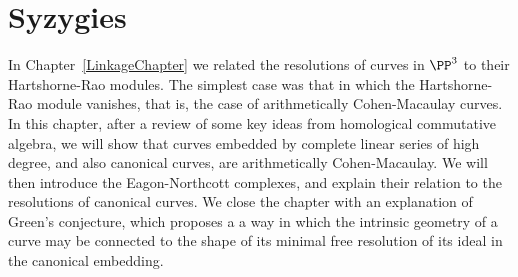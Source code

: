 

\chapter{Syzygies}
\label{SyzygiesChapter}

%
%
%
%
%
\def\length{{\rm length}}

%
%


In Chapter~\ref{LinkageChapter} we related the resolutions of curves in $\PP^3$ to their Hartshorne-Rao modules. The
simplest case was that in which the Hartshorne-Rao module vanishes, that is, the case of arithmetically Cohen-Macaulay curves.
In this chapter, after a review of some key ideas from homological commutative algebra, we will show that curves embedded by complete linear series of high degree, and also canonical curves, are arithmetically
Cohen-Macaulay. We will then introduce the Eagon-Northcott complexes, and explain their relation to the resolutions of canonical curves. We close the chapter with an explanation of Green's conjecture, which proposes a a way in which the intrinsic geometry
of a curve may be connected to the shape of its minimal free resolution of its ideal in the canonical embedding.


